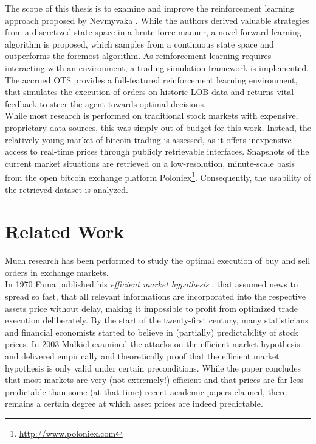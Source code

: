 The scope of this thesis is to examine and improve the reinforcement learning approach proposed by Nevmyvaka \etal\cite{Nevmyvaka:2006}. While the authors derived valuable strategies from a discretized state space in a brute force manner, a novel forward learning algorithm is proposed, which samples from a continuous state space and outperforms the foremost algorithm. As reinforcement learning requires interacting with an environment, a trading simulation framework is implemented. The accrued \acf{OTS} provides a full-featured reinforcement learning environment, that simulates the execution of orders on historic \ac{LOB} data and returns vital feedback to steer the agent towards optimal decisions.\\

While most research is performed on traditional stock markets with expensive, proprietary data sources, this was simply out of budget for this work. Instead, the relatively young market of bitcoin trading is assessed, as it offers inexpensive access to real-time prices through publicly retrievable interfaces. Snapshots of the current market situations are retrieved on a low-resolution, minute-scale basis from the open bitcoin exchange platform Poloniex\footnote{\url{http://www.poloniex.com}}. Consequently, the usability of the retrieved dataset is analyzed.



\section{Related Work}
\label{sec:relatedwork}
Much research has been performed to study the optimal execution of buy and sell orders in exchange markets.\\

In 1970 Fama published his \emph{efficient market hypothesis} \Cite{Fama70efficientcapital}, that assumed news to spread so fast, that all relevant informations are incorporated into the respective assets price without delay, making it impossible to profit from optimized trade execution deliberately. By the start of the twenty-first century, many statisticians and financial economists started to believe in (partially) predictability of stock prices. In 2003 Malkiel \Cite{TheEfficentMarketHypothesisAndItsCritics} examined the attacks on the efficient market hypothesis and delivered empirically and theoretically proof that the efficient market hypothesis is only valid under certain preconditions. While the paper concludes that most markets are very (not extremely!) efficient and that prices are far less predictable than some (at that time) recent academic papers claimed, there remains a certain degree at which asset prices are indeed predictable.\\

